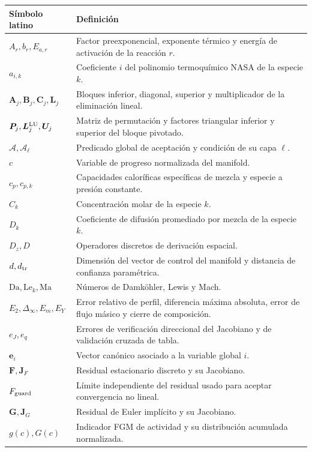 \documentclass[12pt,a4paper,twoside,openany]{book}
\newcommand{\vect}[1]{\bm{#1}}
\newcommand{\mat}[1]{\bm{#1}}
\begin{document}
\begin{longtable}{@{}p{}p{}@{}}
\toprule
\textbf{Símbolo latino} & \textbf{Definición} \\
\midrule
\endhead
\(A_r,b_r,E_{a,r}\) & Factor preexponencial, exponente térmico y energía de activación de la reacción \(r\). \\
\(a_{i,k}\) & Coeficiente \(i\) del polinomio termoquímico NASA de la especie \(k\). \\
\(\mat A_j,\mat B_j,\mat C_j,\mat L_j\) & Bloques inferior, diagonal, superior y multiplicador de la eliminación lineal. \\
\(\mat P_j,\mat L_j^{\rm LU},\mat U_j\) & Matriz de permutación y factores triangular inferior y superior del bloque pivotado. \\
\(\mathcal A,\mathcal A_\ell\) & Predicado global de aceptación y condición de su capa \(\ell\). \\
\(c\) & Variable de progreso normalizada del manifold. \\
\(c_p,c_{p,k}\) & Capacidades caloríficas específicas de mezcla y especie a presión constante. \\
\(C_k\) & Concentración molar de la especie \(k\). \\
\(D_k\) & Coeficiente de difusión promediado por mezcla de la especie \(k\). \\
\(D_z,D\) & Operadores discretos de derivación espacial. \\
\(d,d_{\rm tr}\) & Dimensión del vector de control del manifold y distancia de confianza paramétrica. \\
\(\mathrm{Da},\mathrm{Le}_k,\mathrm{Ma}\) & Números de Damköhler, Lewis y Mach. \\
\(E_2,\Delta_{\infty},E_m,E_Y\) & Error relativo de perfil, diferencia máxima absoluta, error de flujo másico y cierre de composición. \\
\(e_J,e_q\) & Errores de verificación direccional del Jacobiano y de validación cruzada de tabla. \\
\(\vect e_i\) & Vector canónico asociado a la variable global \(i\). \\
\(\vect F,\mat J_F\) & Residual estacionario discreto y su Jacobiano. \\
\(F_{\rm guard}\) & Límite independiente del residual usado para aceptar convergencia no lineal. \\
\(\vect G,\mat J_G\) & Residual de Euler implícito y su Jacobiano. \\
\(g(c),G(c)\) & Indicador FGM de actividad y su distribución acumulada normalizada. \\

\end{longtable}
\end{document}
